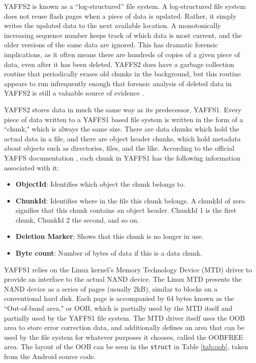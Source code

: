 YAFFS2 is known as a ``log-structured'' file system.  A log-structured file system does not reuse flash pages when a piece of data is
updated.  Rather, it simply writes the updated data to the next available location.  A monotonically increasing sequence number
keeps track of which data is most current, and the older versions of the same data are ignored.  This has dramatic forensic
implications, as it often means there are hundreds of copies of a given piece of data, even after it has been deleted.  YAFFS2 does
have a garbage collection routine that periodically erases old chunks in the background, but this routine appears to run
infrequently enough that forensic analysis of deleted data in YAFFS2 is still a valuable source of evidence \cite{naval}. 

YAFFS2 stores data in much the same way as its predecessor, YAFFS1.  Every piece of data written to a YAFFS1 based file system is
written in the form of a ``chunk," which is always the same size.  There are data chunks which hold the actual data in a file, and
there are object header chunks, which hold metadata about objects such as directories, files, and the like.  According to the
official YAFFS documentation \cite{howyaffsworks}, each chunk in YAFFS1
has the following information associated with it:

\begin{itemize}
	\item {\bf ObjectId}: Identifies which object the chunk belongs to.\
	\item {\bf ChunkId}: Identifies where in the file this chunk belongs. 
		A chunkId of zero signifies that this chunk contains an object header. 
		ChunkId 1 is the first chunk, ChunkId 2 the second, and so on.
	\item {\bf Deletion Marker}: Shows that this chunk is no longer in use.
	\item {\bf Byte count}: Number of bytes of data if this is a data chunk.
\end{itemize}

YAFFS1 relies on the Linux kernel's Memory Technology Device (MTD) driver to provide an interface to the actual NAND device.  The
Linux MTD presents the NAND device as a series of pages (usually 2kB), similar to blocks on a conventional hard disk.  Each page is
accompanied by 64 bytes known as the ``Out-of-band area," or OOB, which is partially used by the MTD itself and partially used by
the YAFFS1 file system. The MTD driver itself uses the OOB area to store error correction data, and additionally defines an area that
can be used by the file system for whatever purposes it chooses, called the OOBFREE area.  The layout of the OOB can be seen in the
\texttt{struct} in Table \ref{tab:oob}, taken from the Android source code. 

